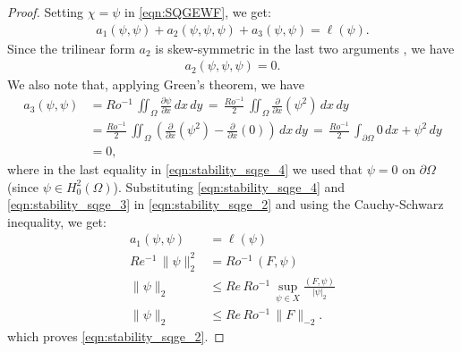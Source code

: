 \begin{proof}
Setting $\chi = \psi$ in \eqref{eqn:SQGEWF}, we get:
\begin{align}
  a_1(\psi, \psi) + a_2(\psi,\psi, \psi) + a_3(\psi, \psi) 
= \ell(\psi) .
\label{eqn:stability_sqge_2}
\end{align}
Since the trilinear form $a_2$ is skew-symmetric in the last two arguments \cite{Girault79,Girault86,Gunzburger89}, we have
\begin{align}
  a_2(\psi,\psi, \psi) = 0 .
  \label{eqn:stability_sqge_3}
\end{align}
We also note that, applying Green's theorem, we have
\begin{align}
  a_3(\psi,\psi) &= Ro^{-1} \, \iint_{\Omega} \frac{\partial \psi}{\partial x} \, dx \, dy 
    \, = \, \frac{Ro^{-1}}{2} \, \iint_{\Omega} \frac{\partial}{\partial x} (\psi^2) \, dx \, dy \nonumber \\
  &= \frac{Ro^{-1}}{2} \, \iint_{\Omega} \left( \frac{\partial}{\partial x} (\psi^2) 
    - \frac{\partial}{\partial x} (0) \right) \, dx \, dy 
    \, = \,  \frac{Ro^{-1}}{2} \, \int_{\partial \Omega} 0 \, dx + \psi^2 \, dy \nonumber \\
  &= 0 ,
\label{eqn:stability_sqge_4}
\end{align}
where in the last equality in \eqref{eqn:stability_sqge_4} we used that $\psi = 0$ on $\partial \Omega$
(since $\psi \in H_0^2(\Omega)$).  Substituting \eqref{eqn:stability_sqge_4} and \eqref{eqn:stability_sqge_3}
in \eqref{eqn:stability_sqge_2} and using the Cauchy-Schwarz inequality, we get:
\begin{align}
  a_1(\psi,\psi) &= \ell(\psi) \nonumber \\
  Re^{-1}\, \|\psi\|_2^2 &= Ro^{-1}\, (F,\psi) \\
  \|\psi\|_2 &\le Re\, Ro^{-1}\,\sup_{\psi \in X} \frac{(F,\psi)}{|\psi|_2} \nonumber \\
  \|\psi\|_2 &\le Re\, Ro^{-1}\, \|F\|_{-2}.
  \label{eqn:stability_sqge_5}
\end{align}
which proves \eqref{eqn:stability_sqge_2}.
\end{proof}
